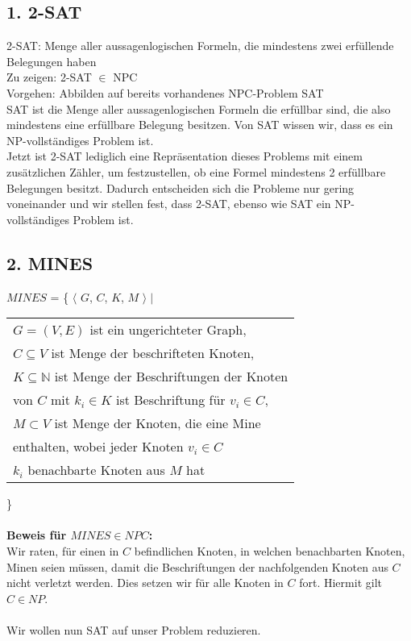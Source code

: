 \subsection*{1. 2-SAT}

2-SAT: Menge aller aussagenlogischen Formeln, die mindestens zwei erfüllende Belegungen haben \\

Zu zeigen: 2-SAT $\in$ NPC \\

Vorgehen: Abbilden auf bereits vorhandenes NPC-Problem SAT \\

SAT ist die Menge aller aussagenlogischen Formeln die erfüllbar sind, die also mindestens eine erfüllbare Belegung besitzen. Von SAT wissen wir, dass es ein NP-vollständiges Problem ist.\\

Jetzt ist 2-SAT lediglich eine Repräsentation dieses Problems mit einem zusätzlichen Zähler, um festzustellen, ob eine Formel mindestens 2 erfüllbare Belegungen besitzt. Dadurch entscheiden sich die Probleme nur gering voneinander und wir stellen fest, dass 2-SAT, ebenso wie SAT ein NP-vollständiges Problem ist.

\subsection*{2. MINES}
$MINES$ = \{ $\langle$ $G$, $C$, $K$, $M$ $\rangle \mid$
\begin{tabular}{l}
$G = (V,E)$ ist ein ungerichteter Graph,\\
$C \subseteq V$ ist Menge der beschrifteten Knoten,\\
$K \subseteq \mathbb{N}$ ist Menge der Beschriftungen der Knoten\\
von $C$ mit $k_i \in K$ ist Beschriftung für $v_i \in C$,\\
$M \subset V$ ist Menge der Knoten, die eine Mine\\
enthalten, wobei jeder Knoten $v_i \in C$\\
$k_i$ benachbarte Knoten aus $M$ hat
\end{tabular}\}\\\\
\textbf{Beweis für $MINES \in NPC$:}\\
Wir raten, für einen in $C$ befindlichen Knoten, in welchen benachbarten Knoten, Minen seien müssen, damit die Beschriftungen der nachfolgenden Knoten aus $C$ nicht verletzt werden. Dies setzen wir für alle Knoten in $C$ fort. Hiermit gilt $C \in NP$.\\\\
Wir wollen nun SAT auf unser Problem reduzieren.\\
